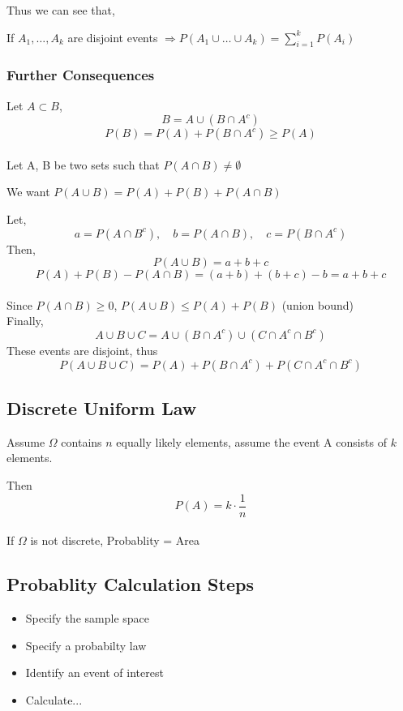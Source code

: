 \documentclass{article}
\begin{document}
Thus we can see that,

If \(A_1, \dots , A_k\) are disjoint events \(\Rightarrow P(A_1 \cup \dots \cup A_k) = \sum_{i=1}^{k} P(A_i) \)

\subsubsection*{Further Consequences}
Let \(A \subset B\),
\[
B = A \cup (B \cap A^c)
\]
\[
P(B) = P(A) + P(B \cap A^c) \geq P(A)
\]
\\

Let A, B be two sets such that \(P(A \cap B) \neq \emptyset\)

We want \(P(A \cup B) = P(A) + P(B) + P(A \cap B)\)

Let,
\[
a = P(A \cap B^c), \quad b = P(A \cap B), \quad c = P(B \cap A^c)
\]
Then,
\[
P(A \cup B) = a + b + c
\]
\[
P(A) + P(B) - P(A \cap B) = (a+b) + (b+c) - b = a + b + c
\]
\\

Since \(P(A \cap B) \geq 0\), \(P(A \cup B) \leq P(A) + P(B)\)   (union bound)
\\

Finally,
\[
A \cup B \cup C = A \cup (B \cap A^c) \cup (C \cap A^c \cap B^c)
\]
These events are disjoint, thus
\[
P(A \cup B \cup C) = P(A) + P(B \cap A^c) + P(C \cap A^c \cap B^c)
\]

\subsection*{Discrete Uniform Law}
Assume \(\Omega\) contains \(n\) equally likely elements, assume the event A
consists of \(k\) elements.

Then
\[
P(A) = k \cdot \frac{1}{n}
\]
\\

If \(\Omega \) is not discrete, Probablity = Area

\subsection*{Probablity Calculation Steps}
\begin{itemize}
    \item Specify the sample space
    \item Specify a probabilty law
    \item Identify an event of interest
    \item Calculate...
\end{itemize}
\end{document}
